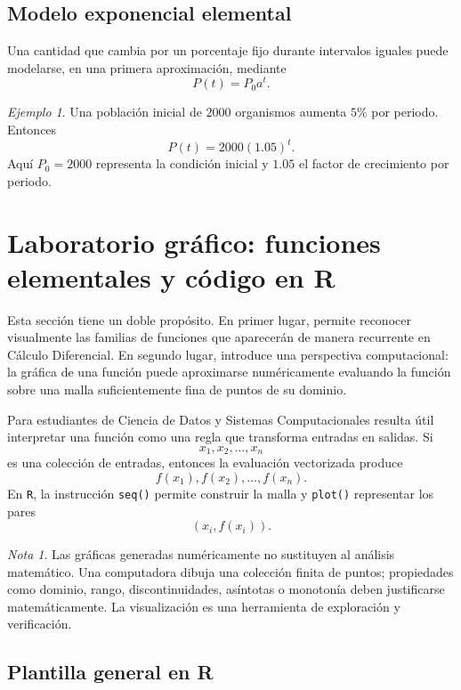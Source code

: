 \documentclass[12pt]{article}
\theoremstyle{remark}
\newtheorem{ejemplo}{Ejemplo}[section]
\newtheorem{nota}{Nota}[section]
\begin{document}
\subsection*{Modelo exponencial elemental}

Una cantidad que cambia por un porcentaje fijo durante intervalos iguales puede
modelarse, en una primera aproximación, mediante
\[
P(t)=P_0a^t.
\]

\begin{ejemplo}
Una población inicial de $2000$ organismos aumenta $5\%$ por periodo. Entonces
\[
P(t)=2000(1.05)^t.
\]
Aquí $P_0=2000$ representa la condición inicial y $1.05$ el factor de
crecimiento por periodo.
\end{ejemplo}


\section{Laboratorio gráfico: funciones elementales y código en R}

Esta sección tiene un doble propósito. En primer lugar, permite reconocer
visualmente las familias de funciones que aparecerán de manera recurrente en
Cálculo Diferencial. En segundo lugar, introduce una perspectiva computacional:
la gráfica de una función puede aproximarse numéricamente evaluando la función
sobre una malla suficientemente fina de puntos de su dominio.

Para estudiantes de Ciencia de Datos y Sistemas Computacionales resulta útil
interpretar una función como una regla que transforma entradas en salidas. Si
\[
x_1,x_2,\ldots,x_n
\]
es una colección de entradas, entonces la evaluación vectorizada produce
\[
f(x_1),f(x_2),\ldots,f(x_n).
\]
En \texttt{R}, la instrucción \texttt{seq()} permite construir la malla y
\texttt{plot()} representar los pares
\[
(x_i,f(x_i)).
\]

\begin{nota}
Las gráficas generadas numéricamente no sustituyen al análisis matemático.
Una computadora dibuja una colección finita de puntos; propiedades como
dominio, rango, discontinuidades, asíntotas o monotonía deben justificarse
matemáticamente. La visualización es una herramienta de exploración y
verificación.
\end{nota}

\subsection*{Plantilla general en R}
\end{document}
